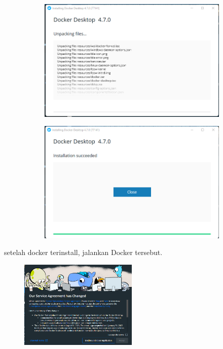 \documentclass[11pt,a4paper]{article}
\begin{document}
\begin{figure}[h]
	\centering
	\begin{subfigure}[b]{0.5\textwidth}
		\centering
		\def\svgwidth{\columnwidth}
		\includegraphics[width=1\textwidth]{Figure/asset/2.png}
	\end{subfigure}
	\begin{subfigure}[b]{0.5\textwidth}
		\centering
		\def\svgwidth{\columnwidth}
		\includegraphics[width=1\textwidth]{Figure/asset/3.png}
	\end{subfigure}
\end{figure}
\newpage
setelah docker terinstall, jalankan Docker tersebut.

\begin{figure}[h]
	\centering
	\includegraphics[width = 0.5\textwidth]{Figure/asset/4.png}
\end{figure}
\end{document}

